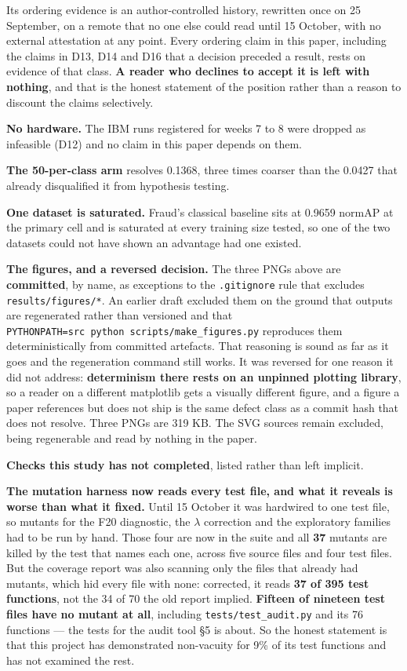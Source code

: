 \documentclass[
  10pt,
]{article}
\newcounter{none} %
\begin{document}
Its ordering evidence is an author-controlled history, rewritten once on
25 September, on a remote that no one else could read until 15 October,
with no external attestation at any point. Every ordering claim in this
paper, including the claims in D13, D14 and D16 that a decision preceded
a result, rests on evidence of that class. \textbf{A reader who declines
to accept it is left with nothing}, and that is the honest statement of
the position rather than a reason to discount the claims selectively.

\textbf{No hardware.} The IBM runs registered for weeks 7 to 8 were
dropped as infeasible (D12) and no claim in this paper depends on them.

\textbf{The 50-per-class arm} resolves 0.1368, three times coarser than
the 0.0427 that already disqualified it from hypothesis testing.

\textbf{One dataset is saturated.} Fraud's classical baseline sits at
0.9659 normAP at the primary cell and is saturated at every training
size tested, so one of the two datasets could not have shown an
advantage had one existed.

\textbf{The figures, and a reversed decision.} The three PNGs above are
\textbf{committed}, by name, as exceptions to the \texttt{.gitignore}
rule that excludes \texttt{results/\allowbreak{}figures/\allowbreak{}*}. An earlier draft excluded
them on the ground that outputs are regenerated rather than versioned
and that \texttt{PYTHONPATH=src\ python\ scripts/\allowbreak{}make\_\allowbreak{}figures.py}
reproduces them deterministically from committed artefacts. That
reasoning is sound as far as it goes and the regeneration command still
works. It was reversed for one reason it did not address:
\textbf{determinism there rests on an unpinned plotting library}, so a
reader on a different matplotlib gets a visually different figure, and a
figure a paper references but does not ship is the same defect class as
a commit hash that does not resolve. Three PNGs are 319 KB. The SVG
sources remain excluded, being regenerable and read by nothing in the
paper.

\textbf{Checks this study has not completed}, listed rather than left
implicit.

\textbf{The mutation harness now reads every test file, and what it
reveals is worse than what it fixed.} Until 15 October it was hardwired
to one test file, so mutants for the F20 diagnostic, the \(\lambda\)
correction and the exploratory families had to be run by hand. Those
four are now in the suite and all \textbf{37} mutants are killed by the
test that names each one, across five source files and four test files.
But the coverage report was also scanning only the files that already
had mutants, which hid every file with none: corrected, it reads
\textbf{37 of 395 test functions}, not the 34 of 70 the old report
implied. \textbf{Fifteen of nineteen test files have no mutant at all},
including \texttt{tests/\allowbreak{}test\_\allowbreak{}audit.py} and its 76 functions --- the
tests for the audit tool \S{}5 is about. So the honest statement is that
this project has demonstrated non-vacuity for 9\% of its test functions
and has not examined the rest.
\end{document}
